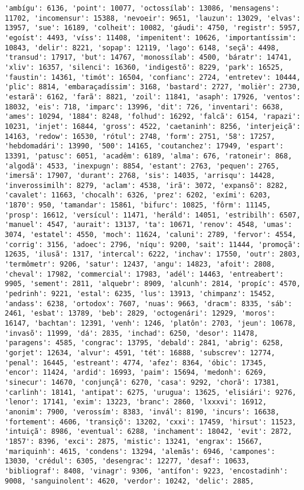 \begin{Verbatim}[commandchars=\\\{\}]
'ambígu': 6136, 'point': 10077, 'octossílab': 13086, 'mensagens': 11702, 'incomensur': 15388, 'nevoeir': 9651, 'lauzun': 13029, 'elvas': 13957, 'sue': 16189, 'colheit': 10082, 'gáudi': 4750, 'registr': 5957, 'egoíst': 4493, 'víss': 11408, 'impenitent': 10626, 'importantíssim': 10843, 'delir': 8221, 'sopap': 12119, 'lago': 6148, 'seçã': 4498, 'transud': 17917, 'but': 14767, 'monossílab': 4500, 'báratr': 14741, 'xliv': 16357, 'silenci': 16360, 'indigestõ': 8229, 'park': 16525, 'faustin': 14361, 'timót': 16504, 'confianc': 2724, 'entretev': 10444, 'plic': 8814, 'embaraçadíssim': 3168, 'bastard': 2727, 'molièr': 2730, 'estarã': 6162, 'farã': 8821, 'zoil': 11841, 'asaph': 17926, 'ventos': 18032, 'eis': 718, 'imparc': 13996, 'dit': 726, 'inventari': 6638, 'ames': 10294, '1884': 8248, 'folhud': 16292, 'falcã': 6154, 'rapazi': 10231, 'injet': 16844, 'gross': 4522, 'caetaninh': 8256, 'interjeiçã': 14163, 'redow': 16530, 'rótul': 2748, 'form': 2751, '58': 17257, 'hebdomadári': 13990, '500': 14165, 'coutanchez': 17949, 'espart': 13391, 'patusc': 6051, 'acadêm': 6189, 'alma': 676, 'ratoneir': 868, 'algodã': 4533, 'inexpugn': 8854, 'estant': 2763, 'pequen': 2765, 'imersã': 17907, 'durant': 2768, 'sis': 14035, 'arrisqu': 14428, 'inverossimilh': 8279, 'aclam': 4538, 'irã': 3072, 'expansõ': 8282, 'cavalet': 11663, 'chocalh': 6326, 'prez': 6202, 'exími': 6203, '1870': 950, 'tamandar': 15861, 'bifurc': 10825, 'fôrm': 11145, 'prosp': 16612, 'versícul': 11471, 'heráld': 14051, 'estribilh': 6507, 'manuel': 4547, 'aurait': 13137, 'ta': 10671, 'renov': 4548, 'umas': 3074, 'estatel': 4550, 'moch': 11624, 'caluni': 2789, 'fervor': 4554, 'corrig': 3156, 'adoec': 2796, 'níqu': 9200, 'sait': 11444, 'promoçã': 12635, 'ilusã': 1317, 'intercal': 6222, 'inchav': 17550, 'outr': 2803, 'termômetr': 9206, 'satur': 12437, 'angu': 14823, 'afoit': 2808, 'cheval': 17982, 'commercial': 17983, 'adél': 14463, 'entreabert': 9905, 'sement': 2811, 'alquebr': 8909, 'alcunh': 2814, 'propíc': 4570, 'pedrinh': 9221, 'estal': 6235, 'lus': 13913, 'chimpanz': 15452, 'andass': 6238, 'ortodox': 7607, 'nuas': 9663, 'dracm': 8335, 'sáb': 2461, 'esbat': 13789, 'beb': 2829, 'octogenári': 12929, 'moros': 16147, 'bachtan': 12391, 'venh': 1246, 'platôn': 2703, 'jeun': 10678, 'invasõ': 11999, 'dá': 2835, 'inchad': 6250, 'desor': 11478, 'paragens': 4585, 'congrac': 13795, 'debald': 2841, 'abrig': 6258, 'gorjet': 12634, 'alvur': 4591, 'tét': 16888, 'subscrev': 12774, 'penal': 16445, 'estreant': 4774, 'afez': 8364, 'óbic': 17345, 'encor': 11424, 'ardid': 16993, 'paim': 15694, 'medonh': 6269, 'sinecur': 14670, 'conjunçã': 6270, 'casa': 9292, 'chorã': 17381, 'carlinh': 18141, 'antipat': 6275, 'urugua': 13625, 'elisiári': 9276, 'lenor': 17141, 'exim': 13223, 'branc': 2860, 'lxxxvi': 16912, 'anonim': 7900, 'verossím': 8383, 'invál': 8190, 'incurs': 16638, 'fortement': 4606, 'transiçõ': 13202, 'cxxi': 17459, 'hirsut': 11523, 'intuiçã': 8986, 'eventual': 6288, 'inchament': 18042, 'evit': 2872, '1857': 8396, 'exci': 2875, 'mistic': 13241, 'engrax': 15667, 'mariquinh': 4615, 'condens': 13294, 'alemãs': 6946, 'campones': 13030, 'crédul': 6305, 'desengrac': 12277, 'desaf': 10633, 'bibliograf': 8408, 'vinagr': 9306, 'antífon': 9223, 'encostadinh': 9008, 'sanguinolent': 4620, 'verdor': 10242, 'delic': 2885, 
\end{Verbatim}

